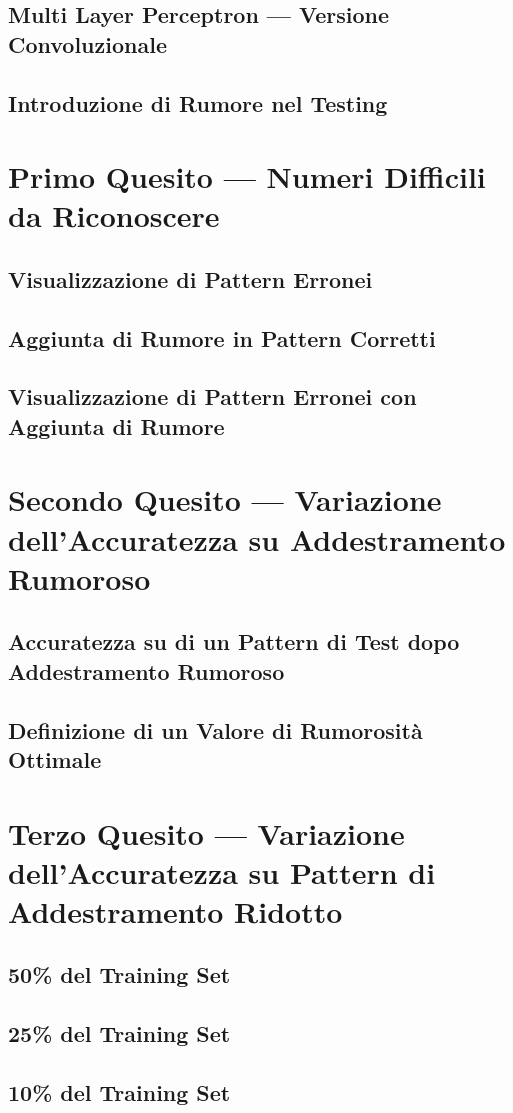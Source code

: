 \documentclass[12pt, a4paper]{article}
\begin{document}
\subsection{Multi Layer Perceptron --- Versione Convoluzionale}
\subsection{Introduzione di Rumore nel Testing}

\newpage
\section{Primo Quesito --- Numeri Difficili da Riconoscere}
\subsection{Visualizzazione di Pattern Erronei}
\subsection{Aggiunta di Rumore in Pattern Corretti}
\subsection{Visualizzazione di Pattern Erronei con Aggiunta di Rumore}

\newpage
\section{Secondo Quesito --- Variazione dell'Accuratezza su Addestramento Rumoroso}
\subsection{Accuratezza su di un Pattern di Test dopo Addestramento Rumoroso}
\subsection{Definizione di un Valore di Rumorosità Ottimale}

\newpage
\section{Terzo Quesito --- Variazione dell'Accuratezza su Pattern di Addestramento Ridotto}
\subsection{50\% del Training Set}
\subsection{25\% del Training Set}
\subsection{10\% del Training Set}
\end{document}
